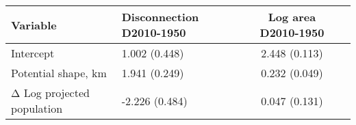 \begin{tabular}{llcr}
\toprule
Variable & Disconnection D2010-1950 & Log area D2010-1950 \\
\midrule
Intercept & 1.002 (0.448) & 2.448 (0.113) \\
Potential shape, km & 1.941 (0.249) & 0.232 (0.049) \\
Δ Log projected population & -2.226 (0.484) & 0.047 (0.131) \\
\bottomrule
\end{tabular}
